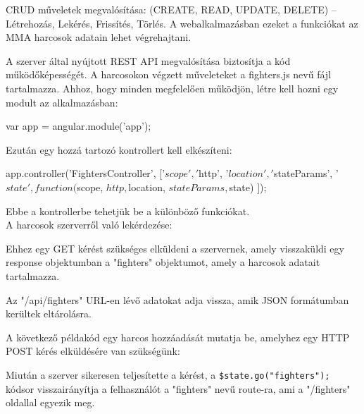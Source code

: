 
CRUD műveletek megvalósítása: (CREATE, READ, UPDATE, DELETE) – Létrehozás, Lekérés, Frissítés, Törlés.
A webalkalmazásban ezeket a funkciókat az MMA harcosok adatain lehet végrehajtani.

A szerver által nyújtott REST API megvalósítása biztosítja a kód működőképességét. A harcosokon végzett műveleteket a fighters.js nevű fájl tartalmazza.
Ahhoz, hogy minden megfelelően működjön, létre kell hozni egy modult az alkalmazásban:

\begin{cpp}
var app = angular.module('app');
\end{cpp}

Ezután egy hozzá tartozó kontrollert kell elkészíteni:

\begin{cpp}
app.controller('FightersController', ['$scope', '$http', '$location', 
'$stateParams',  '$state', function($scope, $http, $location, 
$stateParams, $state){
}]);
\end{cpp}

Ebbe a kontrollerbe tehetjük be a különböző funkciókat. \\A harcosok szerverről való lekérdezése:


Ehhez egy GET kérést szükséges elküldeni a szervernek, amely visszaküldi egy response objektumban a "fighters" objektumot, amely a harcosok adatait tartalmazza.

Az "/api/fighters" URL-en lévő adatokat adja vissza, amik JSON formátumban kerültek eltárolásra.

A következő példakód egy harcos hozzáadását mutatja be, amelyhez egy HTTP POST kérés elküldésére van szükségünk:


Miután a szerver sikeresen teljesítette a kérést, a \texttt{\$state.go("fighters");} kódsor
visszairányítja a felhasználót a "fighters" nevű route-ra, ami a "/fighters" oldallal egyezik meg.

